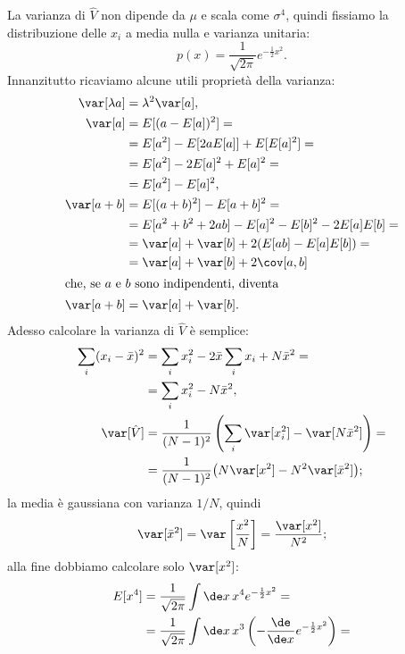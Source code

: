 \begin{solution}
	La varianza di $\hat V$ non dipende da $\mu$ e scala come $\sigma^4$,
	quindi fissiamo la distribuzione delle $x_i$ a media nulla e varianza unitaria:
	\begin{equation*}
		p(x) = \frac1{\sqrt{2\pi}} e^{-\frac12 x^2}.
	\end{equation*}
	Innanzitutto ricaviamo alcune utili proprietà della varianza:
	\begin{align*}
		\var[\lambda a] &= \lambda^2 \var[a], \\
		\var[a]
		&= E[(a-E[a])^2] = \\
		&= E[a^2] - E[2aE[a]] + E[E[a]^2] = \\
		&= E[a^2] - 2E[a]^2 + E[a]^2 = \\
		&= E[a^2] - E[a]^2, \\
		\var[a+b]
		&= E[(a+b)^2] - E[a+b]^2 = \\
		&= E[a^2 + b^2 + 2ab] - E[a]^2 - E[b]^2 - 2E[a]E[b] = \\
		&= \var[a] + \var[b] + 2(E[ab] - E[a]E[b]) = \\
		&= \var[a] + \var[b] + 2\cov[a,b] \\
		\intertext{che, se $a$ e $b$ sono indipendenti, diventa}
		\var[a+b] &= \var[a] + \var[b].
	\end{align*}
	Adesso calcolare la varianza di $\hat V$ è semplice:
	\begin{align*}
		\sum_i (x_i-\bar x)^2
		&= \sum_ix_i^2 - 2\bar x\sum_ix_i + N\bar x^2 = \\
		&= \sum_ix_i^2 - N\bar x^2, \\
		\var[\hat V]
		&= \frac1{(N-1)^2} \left( \sum_i\var[x_i^2] - \var[N\bar x^2] \right) = \\
		&= \frac1{(N-1)^2} \big( N\var[x^2] - N^2\var[\bar x^2] \big);
	\end{align*}
	la media è gaussiana con varianza $1/N$, quindi
	\begin{align*}
		\var[\bar x^2]
		= \var \left[ \frac{x^2}N \right ]
		= \frac{\var[x^2]}{N^2};
	\end{align*}
	alla fine dobbiamo calcolare solo $\var[x^2]$:
	\begin{align*}
		E[x^4]
		&= \frac1{\sqrt{2\pi}} \int\de x\, x^4 e^{-\frac12 x^2} = \\
		&= \frac1{\sqrt{2\pi}} \int\de x\, x^3 \left (-\frac{\de}{\de x} e^{-\frac12 x^2} \right) = \\

\end{align*}
\end{solution}
